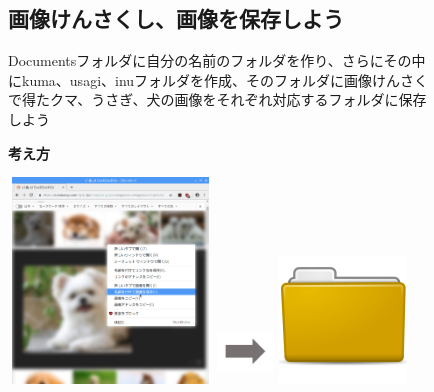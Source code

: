 \documentclass[a4paper,12pt]{jarticle}
\begin{document}
\begin{figure}[t]
  \subsection{\theExercise 
    画像けんさくし、画像を保存しよう}
  Documentsフォルダに自分の名前のフォルダを作り、さらにその中にkuma、usagi、inuフォルダを作成、そのフォルダに画像けんさくで得たクマ、うさぎ、犬の画像をそれぞれ対応するフォルダに保存しよう

  \textbf{考え方}


  \bigskip




  \centering
  \begin{minipage}{\textwidth}
    \begin{minipage}{5.582cm}
      \includegraphics[width=5.413cm,height=5.461cm]{textbook-img092.png}
    \end{minipage}
    \begin{minipage}{3.582cm}
      \includegraphics[width=1.505cm,height=1.707cm]{textbook-img073.png}
    \end{minipage}
    \begin{minipage}{5.582cm}
      \includegraphics[width=3.387cm,height=3.387cm]{textbook-img044.png}
    \end{minipage}
  \end{minipage}



\end{figure}
\end{document}
